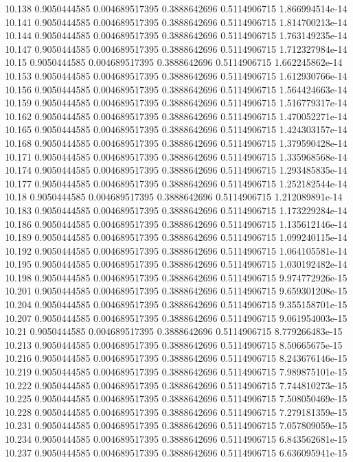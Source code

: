 {10.138 0.9050444585 0.004689517395 0.3888642696 0.5114906715 1.866994514e-14
10.141 0.9050444585 0.004689517395 0.3888642696 0.5114906715 1.814700213e-14
10.144 0.9050444585 0.004689517395 0.3888642696 0.5114906715 1.763149235e-14
10.147 0.9050444585 0.004689517395 0.3888642696 0.5114906715 1.712327984e-14
10.15 0.9050444585 0.004689517395 0.3888642696 0.5114906715 1.662245862e-14
10.153 0.9050444585 0.004689517395 0.3888642696 0.5114906715 1.612930766e-14
10.156 0.9050444585 0.004689517395 0.3888642696 0.5114906715 1.564424663e-14
10.159 0.9050444585 0.004689517395 0.3888642696 0.5114906715 1.516779317e-14
10.162 0.9050444585 0.004689517395 0.3888642696 0.5114906715 1.470052271e-14
10.165 0.9050444585 0.004689517395 0.3888642696 0.5114906715 1.424303157e-14
10.168 0.9050444585 0.004689517395 0.3888642696 0.5114906715 1.379590428e-14
10.171 0.9050444585 0.004689517395 0.3888642696 0.5114906715 1.335968568e-14
10.174 0.9050444585 0.004689517395 0.3888642696 0.5114906715 1.293485835e-14
10.177 0.9050444585 0.004689517395 0.3888642696 0.5114906715 1.252182544e-14
10.18 0.9050444585 0.004689517395 0.3888642696 0.5114906715 1.212089891e-14
10.183 0.9050444585 0.004689517395 0.3888642696 0.5114906715 1.173229284e-14
10.186 0.9050444585 0.004689517395 0.3888642696 0.5114906715 1.135612146e-14
10.189 0.9050444585 0.004689517395 0.3888642696 0.5114906715 1.099240115e-14
10.192 0.9050444585 0.004689517395 0.3888642696 0.5114906715 1.064105581e-14
10.195 0.9050444585 0.004689517395 0.3888642696 0.5114906715 1.030192482e-14
10.198 0.9050444585 0.004689517395 0.3888642696 0.5114906715 9.974772926e-15
10.201 0.9050444585 0.004689517395 0.3888642696 0.5114906715 9.659301208e-15
10.204 0.9050444585 0.004689517395 0.3888642696 0.5114906715 9.355158701e-15
10.207 0.9050444585 0.004689517395 0.3888642696 0.5114906715 9.061954003e-15
10.21 0.9050444585 0.004689517395 0.3888642696 0.5114906715 8.779266483e-15
10.213 0.9050444585 0.004689517395 0.3888642696 0.5114906715 8.50665675e-15
10.216 0.9050444585 0.004689517395 0.3888642696 0.5114906715 8.243676146e-15
10.219 0.9050444585 0.004689517395 0.3888642696 0.5114906715 7.989875101e-15
10.222 0.9050444585 0.004689517395 0.3888642696 0.5114906715 7.744810273e-15
10.225 0.9050444585 0.004689517395 0.3888642696 0.5114906715 7.508050469e-15
10.228 0.9050444585 0.004689517395 0.3888642696 0.5114906715 7.279181359e-15
10.231 0.9050444585 0.004689517395 0.3888642696 0.5114906715 7.057809059e-15
10.234 0.9050444585 0.004689517395 0.3888642696 0.5114906715 6.843562681e-15
10.237 0.9050444585 0.004689517395 0.3888642696 0.5114906715 6.636095941e-15
}
